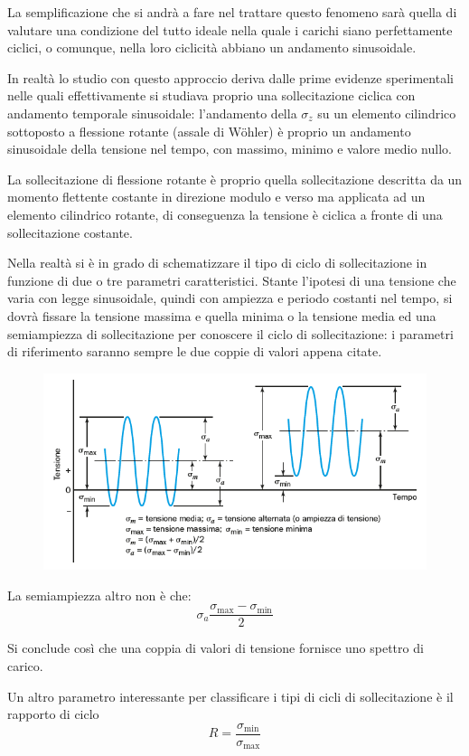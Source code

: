 		La semplificazione che si andrà a fare nel trattare questo fenomeno sarà quella di valutare una condizione del tutto ideale nella quale i carichi siano perfettamente ciclici, o comunque, nella loro ciclicità abbiano un andamento sinusoidale. \newline
		
		In realtà lo studio con questo approccio deriva dalle prime evidenze sperimentali nelle quali  effettivamente si studiava proprio una sollecitazione ciclica con andamento temporale sinusoidale: l'andamento della $ \sigma_z $ su un elemento cilindrico sottoposto a flessione rotante (assale di Wöhler) è proprio un andamento sinusoidale della tensione nel tempo, con massimo, minimo e valore medio nullo.
		
		La sollecitazione di flessione rotante è proprio quella sollecitazione descritta da un momento flettente costante in direzione modulo e verso ma applicata ad un elemento cilindrico rotante, di conseguenza la tensione è ciclica a fronte di una sollecitazione costante.  \newline
		
		Nella realtà si è in grado di schematizzare il tipo di ciclo di sollecitazione in funzione di due o tre parametri caratteristici. Stante l'ipotesi di una tensione che varia con legge sinusoidale, quindi con ampiezza e periodo costanti nel tempo, si dovrà fissare la tensione massima e quella minima o la tensione media ed una semiampiezza di sollecitazione per conoscere il ciclo di sollecitazione: i parametri di riferimento saranno sempre le due coppie di valori appena citate.
		\begin{figure}[H]
			\centering
			\includegraphics[width=0.5\linewidth]{immagini_10/screenshot012}
			\label{fig:screenshot012}
		\end{figure}
		
		La semiampiezza altro non è che:
		\[\sigma_a\dfrac{\sigma_{\max}-\sigma_{\min}}{2}\]
		
		Si conclude così che una coppia di valori di tensione fornisce uno spettro di carico. \newline 
		
		Un altro parametro interessante per classificare i tipi di cicli di sollecitazione è il rapporto di ciclo
		\[R= \dfrac{\sigma_{\min}}{\sigma_{\max}}\]
		
